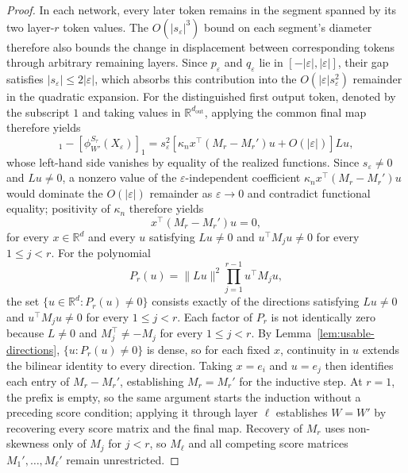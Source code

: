 \documentclass[mlmain]{jmlr}
\newcommand{\R}{\mathbb{R}}
\begin{document}
\begin{proof}
In each network, every later token remains in the segment spanned by its
two layer-$r$ token values.  The $O(|s_\varepsilon|^3)$ bound on each
segment's diameter therefore also bounds the change in displacement between
corresponding tokens through arbitrary remaining layers.  Since
$p_\varepsilon$ and $q_\varepsilon$ lie in $[-|\varepsilon|,|\varepsilon|]$,
their gap satisfies $|s_\varepsilon|\le2|\varepsilon|$, which absorbs this
contribution into the $O(|\varepsilon|s_\varepsilon^2)$ remainder in the
quadratic expansion.  For the distinguished first output token, denoted by
the subscript $1$ and taking values in $\R^{d_{\mathrm{out}}}$, applying the
common final map therefore yields
\begin{equation}
 [\phi_W^{S_\tau}(X_\varepsilon)]_1
 -[\phi_{W'}^{S_\tau}(X_\varepsilon)]_1
 =s_\varepsilon^2
   \left[\kappa_n x^\top(M_r-M_r')u+O(|\varepsilon|)\right]Lu,
 \label{eq:directional-recovery-proof}
\end{equation}
whose left-hand side vanishes by equality of the realized functions.
Since $s_\varepsilon\ne0$ and $Lu\ne0$, a nonzero value of the
$\varepsilon$-independent coefficient $\kappa_n x^\top(M_r-M_r')u$
would dominate the $O(|\varepsilon|)$ remainder as $\varepsilon\to0$
and contradict functional equality; positivity of $\kappa_n$ therefore yields
\begin{equation}
 x^\top(M_r-M_r')u=0,
 \label{eq:directional-bilinear-proof}
\end{equation}
for every $x\in\R^d$ and every $u$ satisfying $Lu\ne0$ and
$u^\top M_j u\ne0$ for every $1\le j<r$.
For the polynomial
\begin{equation}
 P_r(u)=\|Lu\|^2\prod_{j=1}^{r-1}u^\top M_j u,
 \label{eq:usable-polynomial-proof}
\end{equation}
the set $\{u\in\R^d:P_r(u)\ne0\}$ consists exactly of the directions
satisfying $Lu\ne0$ and $u^\top M_j u\ne0$ for every $1\le j<r$.
Each factor of $P_r$ is not identically zero because $L\ne0$ and
$M_j^\top\ne-M_j$ for every $1\le j<r$.  By Lemma~\ref{lem:usable-directions},
$\{u:P_r(u)\ne0\}$ is dense, so for each fixed $x$, continuity in $u$ extends the
bilinear identity to every direction.  Taking $x=e_i$ and $u=e_j$ then
identifies each entry of $M_r-M_r'$, establishing $M_r=M_r'$ for the
inductive step.  At $r=1$, the prefix is empty, so the same argument starts
the induction without a preceding score condition; applying it through
layer $\ell$ establishes $W=W'$ by recovering every score matrix and the
final map.  Recovery of $M_r$ uses non-skewness only of $M_j$ for $j<r$,
so $M_\ell$ and all competing score matrices $M_1',\ldots,M_\ell'$
remain unrestricted.


\end{proof}
\end{document}
